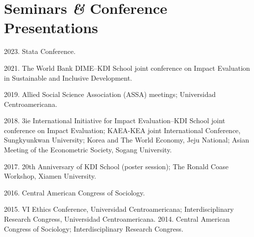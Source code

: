 \documentclass[a4paper, 10pt]{article}
\renewenvironment{itemize}{
  \begin{list}{}
    { \setlength{\itemsep}{5pt}
      \setlength{\parsep}{0pt}
      \setlength{\topsep}{0pt}
      \setlength{\leftmargin}{0em} } }{
  \end{list}}
\begin{document}


\section*{Seminars \textit{\&} Conference Presentations}

\begin{itemize}
  \item 2023. Stata Conference. 
  \item 2021. The World Bank DIME--KDI School joint conference on
  Impact Evaluation in Sustainable and Inclusive Development. 
  \item 2019. Allied Social Science Association (ASSA) meetings;
  Universidad Centroamericana. 
  \item 2018. 3ie International Initiative for Impact Evaluation--KDI
  School joint conference on Impact Evaluation; KAEA-KEA joint International
  Conference, Sungkyunkwan University; Korea and The World Economy, Jeju
  National; Asian Meeting of the Econometric Society, Sogang University. 
  \item 2017. 20th Anniversary of KDI School (poster session); The
  Ronald Coase Workshop, Xiamen University. 
  \item 2016. Central American Congress of Sociology. 
  \item 2015. VI Ethics Conference, Universidad Centroamericana; Interdisciplinary Research Congress, Universidad Centroamericana. 2014. Central American Congress of Sociology; Interdisciplinary Research Congress.
\end{itemize}
\end{document}
